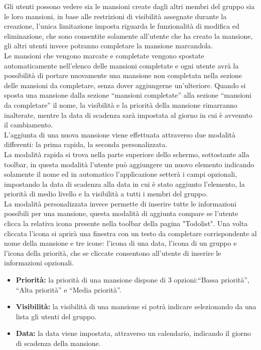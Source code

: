 Gli utenti possono vedere sia le mansioni create dagli altri membri del gruppo sia le loro mansioni, in base alle restrizioni di visibilità assegnate durante la creazione, l'unica limitazione imposta riguarda le funzionalità di modifica ed eliminazione, che sono consentite solamente all'utente che ha creato la mansione, gli altri utenti invece potranno completare la mansione marcandola.\\
Le mansioni che vengono marcate e completate vengono spostate automaticamente nell'elenco delle mansioni completate e ogni utente avrà la possibilità di portare nuovamente una mansione non completata nella sezione delle mansioni da completare, senza dover aggiungerne un'ulteriore. Quando si sposta una mansione dalla sezione ``mansioni completate'' alla sezione ``mansioni da completare'' il nome, la visibilità e la priorità della mansione rimarranno inalterate, mentre la data di scadenza sarà impostata al giorno in cui è avvenuto il cambiamento.\\
L'aggiunta di una nuova mansione viene effettuata attraverso due modalità differenti: la prima rapida, la seconda personalizzata.\\
La modalità rapida si trova nella parte superiore dello schermo, sottostante alla toolbar, in questa modalità l'utente può aggiungere un nuovo elemento indicando solamente il nome ed in automatico l'applicazione setterà i campi opzionali, impostando la data di scadenza alla data in cui è stato aggiunto l'elemento, la priorità di medio livello e la visibilità a tutti i membri del gruppo.\\
La modalità personalizzata invece permette di inserire tutte le informazioni possibili per una mansione, questa modalità di aggiunta compare se l'utente clicca la relativa icona presente nella toolbar della pagina "Todolist". Una volta cliccata l'icona si aprirà una finestra con un testo da completare corrispondente al nome della mansione e tre icone: l'icona di una data, l'icona di un gruppo e l'icona della priorità, che se cliccate consentono all'utente di inserire le informazioni opzionali.
\begin{itemize}
    \item \textbf{Priorità:} la priorità di una mansione dispone di 3 opzioni:``Bassa priorità'', ``Alta priorità'' e ``Media priorità''.
    \item \textbf{Visibilità:} la visibilità di una mansione si potrà indicare selezionando da una lista gli utenti del gruppo.
    \item \textbf{Data:} la data viene impostata, attraverso un calendario, indicando il giorno di scadenza della mansione.
\end{itemize}



